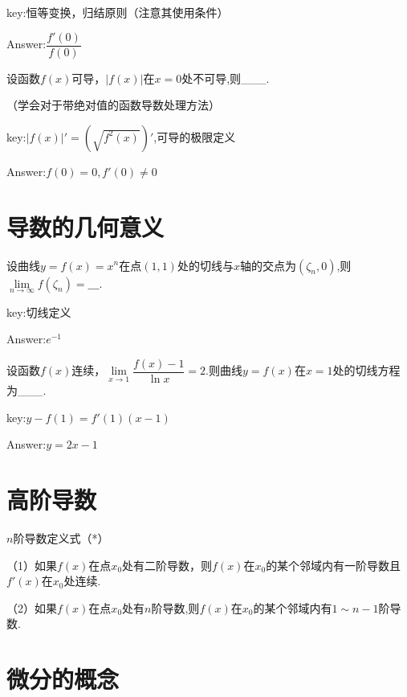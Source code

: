 \documentclass[12pt, a4paper, oneside]{ctexbook}
\begin{document}
\hspace*{\fill}

key:恒等变换，归结原则（注意其使用条件）

Answer:$\dfrac{f'(0)}{f(0)}$

\hspace*{\fill}

设函数$f(x)$可导，$|f(x)|$在$x=0$处不可导,则\_\_\_.

（学会对于带绝对值的函数导数处理方法）

key:$|f(x)|'=(\sqrt{f^2(x)})'$,可导的极限定义

Answer:$f(0)=0,f'(0)\neq 0$

\hspace*{\fill}

\section{导数的几何意义}


设曲线$y=f(x)=x^n$在点$(1,1)$处的切线与$x$轴的交点为$(\zeta_n,0)$,则$\lim\limits_{n \to \infty}f(\zeta_n)=\_\_\_.$

key:切线定义

Answer:$e^{-1}$

\hspace*{\fill}

设函数$f(x)$连续，$\lim\limits_{x \to 1}\dfrac{f(x)-1}{\ln x}=2.$则曲线$y=f(x)$在$x=1$处的切线方程为\_\_\_.

key:$y-f(1)=f'(1)(x-1)$

Answer:$y=2x-1$

\hspace*{\fill}


\section{高阶导数}

$n$阶导数定义式（*）

\hspace*{\fill}

（1）如果$f(x)$在点$x_0$处有二阶导数，则$f(x)$在$x_0$的某个邻域内有一阶导数且$f'(x)$在$x_0$处连续.

（2）如果$f(x)$在点$x_0$处有$n$阶导数,则$f(x)$在$x_0$的某个邻域内有$1\sim n-1$阶导数.


\section{微分的概念}
\end{document}
